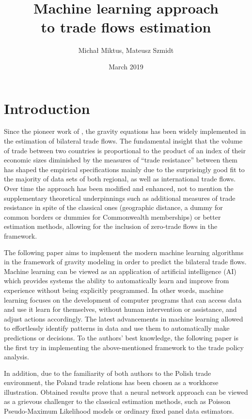 \documentclass{Trade_template}
\author{Michał Miktus, Mateusz Szmidt}
\title{Machine learning approach \\
to trade flows estimation}
\date{March 2019}
\numberwithin{equation}{section}
\begin{document}
\maketitle

\tableofcontents
\listoffigures
\listoftables


\chapter*{Introduction} \label{Introduction}

Since the pioneer work of \citet{tinbergen1962analysis}, the gravity equations has been widely implemented in the estimation of bilateral trade flows. The fundamental insight that the volume of trade between two countries is proportional to the product of an index of their economic sizes diminished by the measures of “trade resistance” between them has shaped the empirical specifications mainly due to the surprisingly good fit to the majority of data sets of both regional, as well as international trade flows. Over time the \citet{tinbergen1962analysis} approach has been modified and enhanced, not to mention the supplementary theoretical underpinnings such as additional measures of trade resistance in spite of the classical ones (geographic distance, a dummy for common borders or dummies for Commonwealth memberships) or better estimation methods, allowing for the inclusion of zero-trade flows in the framework. 

The following paper aims to implement the modern machine learning algorithms in the framework of gravity modeling in order to predict the bilateral trade flows. Machine learning can be viewed as an application of artificial intelligence (AI) which provides systems the ability to automatically learn and improve from experience without being explicitly programmed. In other words, machine learning focuses on the development of computer programs that can access data and use it learn for themselves, without human intervention or assistance, and adjust actions accordingly. The latest advancements in machine learning allowed to effortlessly identify patterns in data and use them to automatically make predictions or decisions. To the authors' best knowledge, the following paper is the first try in implementing the above-mentioned framework to the trade policy analysis.

In addition, due to the familiarity of both authors to the Polish trade environment, the Poland trade relations has been chosen as a workhorse illustration. Obtained results prove that a neural network approach can be viewed as a grievous challenger to the classical estimation methods, such as Poisson Pseudo-Maximum Likelihood models or ordinary fixed panel data estimators.
\end{document}
